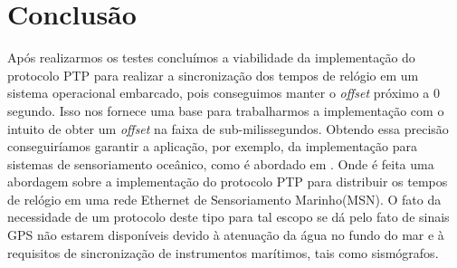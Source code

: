 \section{Conclusão} \label{concl}

Após realizarmos os testes concluímos a viabilidade da implementação do protocolo PTP para realizar a sincronização dos tempos de relógio em um sistema operacional embarcado, pois conseguimos manter o {\it offset} próximo a 0 segundo. Isso nos fornece uma base para trabalharmos a implementação com o intuito de obter um {\it offset} na faixa de sub-milissegundos. Obtendo essa precisão conseguiríamos garantir a aplicação, por exemplo, da implementação para sistemas de sensoriamento oceânico, como é abordado em \cite{DelRio2012}. Onde é feita uma abordagem sobre a implementação do protocolo PTP para distribuir os tempos de relógio em uma rede Ethernet de Sensoriamento Marinho(MSN). O fato da necessidade de um protocolo deste tipo para tal escopo se dá pelo fato de sinais GPS não estarem disponíveis devido à atenuação da água no fundo do mar e à requisitos de sincronização de instrumentos marítimos, tais como sismógrafos.



